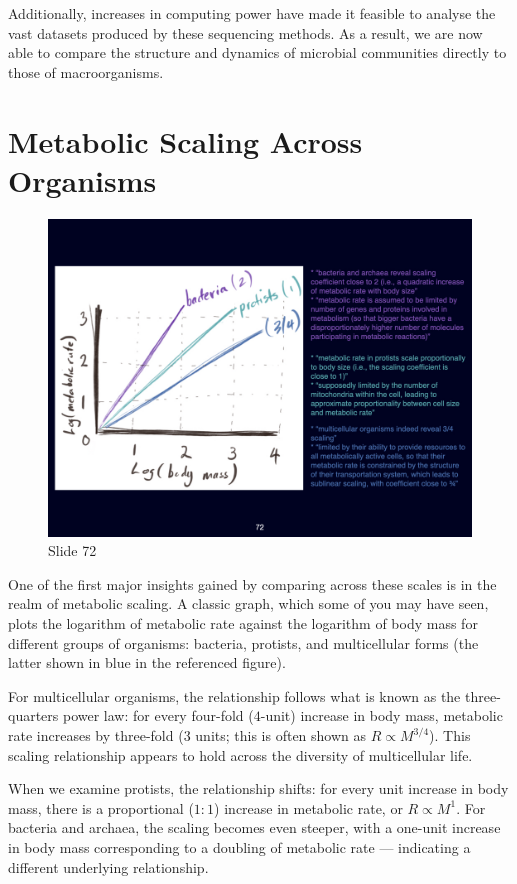 \documentclass[
  10pt,
]{book}
\begin{document}
Additionally, increases in computing power have made it feasible to
analyse the vast datasets produced by these sequencing methods. As a
result, we are now able to compare the structure and dynamics of
microbial communities directly to those of macroorganisms.

\section{Metabolic Scaling Across
Organisms}\label{metabolic-scaling-across-organisms}

\begin{figure}[ht]
\centering
\includegraphics[width=0.8\linewidth]{../images/BDC334/BDC334-072.jpeg}
\caption*{Slide 72}
\end{figure}

One of the first major insights gained by comparing across these scales
is in the realm of metabolic scaling. A classic graph, which some of you
may have seen, plots the logarithm of metabolic rate against the
logarithm of body mass for different groups of organisms: bacteria,
protists, and multicellular forms (the latter shown in blue in the
referenced figure).

For multicellular organisms, the relationship follows what is known as
the three-quarters power law: for every four-fold (\(4\)-unit) increase
in body mass, metabolic rate increases by three-fold (\(3\) units; this
is often shown as \(R \propto M^{3/4}\)). This scaling relationship
appears to hold across the diversity of multicellular life.

When we examine protists, the relationship shifts: for every unit
increase in body mass, there is a proportional (\(1:1\)) increase in
metabolic rate, or \(R \propto M^1\). For bacteria and archaea, the
scaling becomes even steeper, with a one-unit increase in body mass
corresponding to a doubling of metabolic rate --- indicating a different
underlying relationship.
\end{document}
